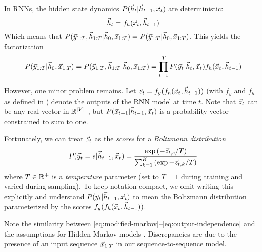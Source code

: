 In RNNs, the hidden state dynamics $P(\vec{h}_t | \vec{h}_{t-1}, \vec{x}_t)$ are deterministic:
\begin{equation}
  \vec{h}_t = f_h(\vec{x}_t, \vec{h}_{t-1})
\end{equation}
Which means that $P(\vec{y}_{1:T}, \vec{h}_{1:T} | \vec{h}_0, \vec{x}_{1:T}) = P(\vec{y}_{1:T} | \vec{h}_0, \vec{x}_{1:T})$.
This yields the factorization
\begin{equation}
  P(\vec{y}_{1:T} | \vec{h}_0, \vec{x}_{1:T})
  = P(\vec{y}_{1:T}, \vec{h}_{1:T} | \vec{h}_0, \vec{x}_{1:T})
  = \prod_{t=1}^T P(\vec{y}_t | \vec{h}_t, \vec{x}_t) f_h(\vec{x}_t, \vec{h}_{t-1})
\end{equation}

However, one minor problem remains. Let $\vec{z}_t = f_y(f_h(\vec{x}_t, \vec{h}_{t-1}))$ (with
$f_y$ and $f_h$ as defined in ) denote the outputs of the RNN model
at time $t$. Note that $\vec{z}_t$ can be any real vector in $\mathbb{R}^{|V|}$
, but $P(\vec{x}_{t+1} | \vec{h}_{t-1}, \vec{x}_{t})$ is
a probability vector constrained to sum to one.

Fortunately, we can treat $\vec{z}_t$ as the \emph{scores} for a \emph{Boltzmann
distribution}
\begin{equation}\label{eq:boltzmann-dist}
    P( \vec{y}_{t} = s | \vec{h}_{t-1}, \vec{x}_t )
    = \frac{\exp \left(-\vec{z}_{t,s}/T\right) }{ \sum_{k=1}^{K} \left(\exp -\vec{z}_{t,k}/T\right)}
\end{equation}
where $T \in \mathbb{R}^+$ is a \emph{temperature} parameter (set to $T=1$ during training and varied during sampling).
To keep notation compact, we omit writing this explicitly and understand $P(\vec{y}_t | \vec{h}_{t-1}, \vec{x}_t)$ to mean
the Boltzmann distribution parameterized by the scores $f_y(f_h(\vec{x}_t, \vec{h}_{t-1}))$.

Note the similarity between \cref{eq:modified-markov}--\cref{eq:output-independence}
and the assumptions for Hidden Markov models \citep{ramage2007hidden}. Discrepancies are due
to the presence of an input sequence $\vec{x}_{1:T}$ in our sequence-to-sequence model.



